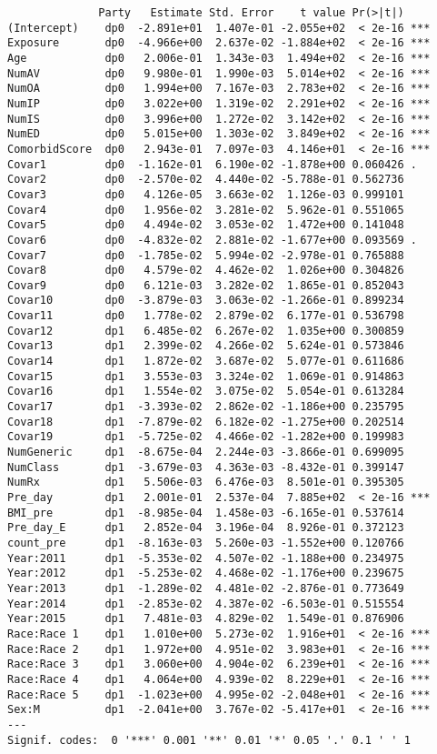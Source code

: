 \documentclass[12]{article}
\begin{document}
\begin{verbatim}
              Party   Estimate Std. Error    t value Pr(>|t|)    
(Intercept)    dp0  -2.891e+01  1.407e-01 -2.055e+02  < 2e-16 ***
Exposure       dp0  -4.966e+00  2.637e-02 -1.884e+02  < 2e-16 ***
Age            dp0   2.006e-01  1.343e-03  1.494e+02  < 2e-16 ***
NumAV          dp0   9.980e-01  1.990e-03  5.014e+02  < 2e-16 ***
NumOA          dp0   1.994e+00  7.167e-03  2.783e+02  < 2e-16 ***
NumIP          dp0   3.022e+00  1.319e-02  2.291e+02  < 2e-16 ***
NumIS          dp0   3.996e+00  1.272e-02  3.142e+02  < 2e-16 ***
NumED          dp0   5.015e+00  1.303e-02  3.849e+02  < 2e-16 ***
ComorbidScore  dp0   2.943e-01  7.097e-03  4.146e+01  < 2e-16 ***
Covar1         dp0  -1.162e-01  6.190e-02 -1.878e+00 0.060426 .  
Covar2         dp0  -2.570e-02  4.440e-02 -5.788e-01 0.562736    
Covar3         dp0   4.126e-05  3.663e-02  1.126e-03 0.999101    
Covar4         dp0   1.956e-02  3.281e-02  5.962e-01 0.551065    
Covar5         dp0   4.494e-02  3.053e-02  1.472e+00 0.141048    
Covar6         dp0  -4.832e-02  2.881e-02 -1.677e+00 0.093569 .  
Covar7         dp0  -1.785e-02  5.994e-02 -2.978e-01 0.765888    
Covar8         dp0   4.579e-02  4.462e-02  1.026e+00 0.304826    
Covar9         dp0   6.121e-03  3.282e-02  1.865e-01 0.852043    
Covar10        dp0  -3.879e-03  3.063e-02 -1.266e-01 0.899234    
Covar11        dp0   1.778e-02  2.879e-02  6.177e-01 0.536798    
Covar12        dp1   6.485e-02  6.267e-02  1.035e+00 0.300859    
Covar13        dp1   2.399e-02  4.266e-02  5.624e-01 0.573846    
Covar14        dp1   1.872e-02  3.687e-02  5.077e-01 0.611686    
Covar15        dp1   3.553e-03  3.324e-02  1.069e-01 0.914863    
Covar16        dp1   1.554e-02  3.075e-02  5.054e-01 0.613284    
Covar17        dp1  -3.393e-02  2.862e-02 -1.186e+00 0.235795    
Covar18        dp1  -7.879e-02  6.182e-02 -1.275e+00 0.202514    
Covar19        dp1  -5.725e-02  4.466e-02 -1.282e+00 0.199983    
NumGeneric     dp1  -8.675e-04  2.244e-03 -3.866e-01 0.699095    
NumClass       dp1  -3.679e-03  4.363e-03 -8.432e-01 0.399147    
NumRx          dp1   5.506e-03  6.476e-03  8.501e-01 0.395305    
Pre_day        dp1   2.001e-01  2.537e-04  7.885e+02  < 2e-16 ***
BMI_pre        dp1  -8.985e-04  1.458e-03 -6.165e-01 0.537614    
Pre_day_E      dp1   2.852e-04  3.196e-04  8.926e-01 0.372123    
count_pre      dp1  -8.163e-03  5.260e-03 -1.552e+00 0.120766    
Year:2011      dp1  -5.353e-02  4.507e-02 -1.188e+00 0.234975    
Year:2012      dp1  -5.253e-02  4.468e-02 -1.176e+00 0.239675    
Year:2013      dp1  -1.289e-02  4.481e-02 -2.876e-01 0.773649    
Year:2014      dp1  -2.853e-02  4.387e-02 -6.503e-01 0.515554    
Year:2015      dp1   7.481e-03  4.829e-02  1.549e-01 0.876906    
Race:Race 1    dp1   1.010e+00  5.273e-02  1.916e+01  < 2e-16 ***
Race:Race 2    dp1   1.972e+00  4.951e-02  3.983e+01  < 2e-16 ***
Race:Race 3    dp1   3.060e+00  4.904e-02  6.239e+01  < 2e-16 ***
Race:Race 4    dp1   4.064e+00  4.939e-02  8.229e+01  < 2e-16 ***
Race:Race 5    dp1  -1.023e+00  4.995e-02 -2.048e+01  < 2e-16 ***
Sex:M          dp1  -2.041e+00  3.767e-02 -5.417e+01  < 2e-16 ***
--- 
Signif. codes:  0 '***' 0.001 '**' 0.01 '*' 0.05 '.' 0.1 ' ' 1


\end{verbatim}
\end{document}
